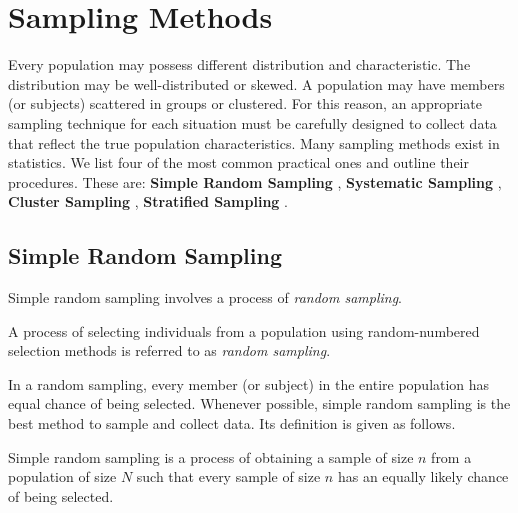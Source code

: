 \section{Sampling Methods}

Every population may possess different distribution and characteristic. The distribution may be well-distributed or skewed. A population may have members (or subjects) scattered in groups or clustered. For this reason, an appropriate sampling technique for each situation must be carefully designed to collect data that reflect the true population characteristics. Many sampling methods exist in statistics. We list four of the most common practical ones and outline their procedures. These are: {\bf{Simple Random Sampling}} , {\bf{Systematic Sampling}} , {\bf{Cluster Sampling}} , {\bf{Stratified Sampling}} .

\subsection{Simple Random Sampling} 

Simple random sampling involves a process of {\it{random sampling}}. 

\begin{definition} \label{random-sampling-001} 
A process of selecting individuals from a population using random-numbered selection methods is referred to as {\it{random sampling}}. 
\end{definition} 

In a random sampling, every member (or subject) in the entire population has equal chance of being selected. Whenever possible, simple random sampling is the best method to sample and collect data. Its definition is given as follows. 

\begin{definition} \label{simple-random-001} 
Simple random sampling is a process of obtaining a sample of size $n$ from a population of size $N$ such that every sample of size $n$ has an equally likely chance of being selected. 
\end{definition} 
   
